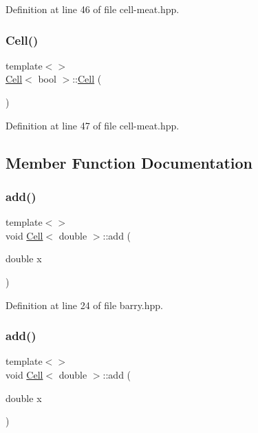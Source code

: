 Definition at line 46 of file cell-\/meat.\+hpp.

\mbox{\label{class_cell_aef4b64101b33e2349ceea132b962d137}} 
\subsubsection{\texorpdfstring{Cell()}{Cell()}\hspace{0.1cm}{\footnotesize\ttfamily [13/13]}}
{\footnotesize\ttfamily template$<$$>$ \\
\hyperlink{class_cell}{Cell}$<$ bool $>$\+::\hyperlink{class_cell}{Cell} (\begin{DoxyParamCaption}{ }\end{DoxyParamCaption})\hspace{0.3cm}{\ttfamily [inline]}}



Definition at line 47 of file cell-\/meat.\+hpp.



\subsection{Member Function Documentation}
\mbox{\label{class_cell_a64d4b92f322ccb8cfbad53f816d2caf8}} 
\subsubsection{\texorpdfstring{add()}{add()}\hspace{0.1cm}{\footnotesize\ttfamily [1/9]}}
{\footnotesize\ttfamily template$<$$>$ \\
void \hyperlink{class_cell}{Cell}$<$ double $>$\+::add (\begin{DoxyParamCaption}\item[{double}]{x }\end{DoxyParamCaption})\hspace{0.3cm}{\ttfamily [inline]}}



Definition at line 24 of file barry.\+hpp.

\mbox{\label{class_cell_a64d4b92f322ccb8cfbad53f816d2caf8}} 
\subsubsection{\texorpdfstring{add()}{add()}\hspace{0.1cm}{\footnotesize\ttfamily [2/9]}}
{\footnotesize\ttfamily template$<$$>$ \\
void \hyperlink{class_cell}{Cell}$<$ double $>$\+::add (\begin{DoxyParamCaption}\item[{double}]{x }\end{DoxyParamCaption})\hspace{0.3cm}{\ttfamily [inline]}}



